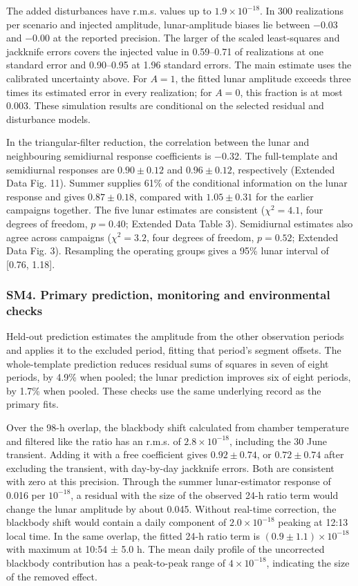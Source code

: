 \documentclass[
  11pt,
  a4paper,
]{article}
\begin{document}
The added disturbances have r.m.s. values up to \(1.9\times10^{-18}\).
In 300 realizations per scenario and injected amplitude, lunar-amplitude
biases lie between −0.03 and −0.00 at the reported precision. The larger
of the scaled least-squares and jackknife errors covers the injected
value in 0.59--0.71 of realizations at one standard error and 0.90--0.95
at 1.96 standard errors. The main estimate uses the calibrated
uncertainty above. For \(A=1\), the fitted lunar amplitude exceeds three
times its estimated error in every realization; for \(A=0\), this
fraction is at most 0.003. These simulation results are conditional on
the selected residual and disturbance models.

In the triangular-filter reduction, the correlation between the lunar
and neighbouring semidiurnal response coefficients is −0.32. The
full-template and semidiurnal responses are \(0.90\pm0.12\) and
\(0.96\pm0.12\), respectively (Extended Data Fig. 11). Summer supplies
61\% of the conditional information on the lunar response and gives
\(0.87\pm0.18\), compared with \(1.05\pm0.31\) for the earlier campaigns
together. The five lunar estimates are consistent (\(\chi^2=4.1\), four
degrees of freedom, \(p=0.40\); Extended Data Table 3). Semidiurnal
estimates also agree across campaigns (\(\chi^2=3.2\), four degrees of
freedom, \(p=0.52\); Extended Data Fig. 3). Resampling the operating
groups gives a 95\% lunar interval of {[}0.76, 1.18{]}.

\hypertarget{sm4.-primary-prediction-monitoring-and-environmental-checks}{%
\subsubsection{SM4. Primary prediction, monitoring and environmental
checks}\label{sm4.-primary-prediction-monitoring-and-environmental-checks}}

Held-out prediction estimates the amplitude from the other observation
periods and applies it to the excluded period, fitting that period's
segment offsets. The whole-template prediction reduces residual sums of
squares in seven of eight periods, by 4.9\% when pooled; the lunar
prediction improves six of eight periods, by 1.7\% when pooled. These
checks use the same underlying record as the primary fits.

Over the 98-h overlap, the blackbody shift calculated from chamber
temperature and filtered like the ratio has an r.m.s. of
\(2.8\times10^{-18}\), including the 30 June transient. Adding it with a
free coefficient gives \(0.92\pm0.74\), or \(0.72\pm0.74\) after
excluding the transient, with day-by-day jackknife errors. Both are
consistent with zero at this precision. Through the summer
lunar-estimator response of 0.016 per \(10^{-18}\), a residual with the
size of the observed 24-h ratio term would change the lunar amplitude by
about 0.045. Without real-time correction, the blackbody shift would
contain a daily component of \(2.0\times10^{-18}\) peaking at 12:13
local time. In the same overlap, the fitted 24-h ratio term is
\((0.9\pm1.1)\times10^{-18}\) with maximum at 10:54 ± 5.0 h. The mean
daily profile of the uncorrected blackbody contribution has a
peak-to-peak range of \(4\times10^{-18}\), indicating the size of the
removed effect.
\end{document}
